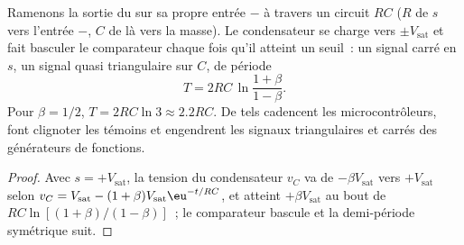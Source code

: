 \begin{proposition}\label{prop:b2:feedback-oscillators:astable}
Ramenons la sortie du  sur sa propre entrée $-$
à travers un circuit $RC$ ($R$ de $s$ vers l'entrée $-$, $C$ de là
vers la masse). Le condensateur se charge vers $\pm V_{\text{sat}}$ et fait basculer le
comparateur chaque fois qu'il atteint un seuil~: un signal carré en $s$, un
signal quasi triangulaire sur $C$, de période
\[
T = 2RC\,\ln\frac{1 + \beta}{1 - \beta} .
\]
Pour $\beta = 1/2$, $T = 2RC\ln3 \approx 2.2RC$. De tels \emph{} cadencent les microcontrôleurs, font clignoter les témoins et engendrent
les signaux triangulaires et carrés des générateurs de fonctions.
\end{proposition}

\begin{proof}
Avec $s = +V_{\text{sat}}$, la tension du condensateur $v_C$ va de
$-\beta V_{\text{sat}}$ vers $+V_{\text{sat}}$ selon $v_C = V_{\text{sat}} - (1 + \beta)
V_{\text{sat}}\eu^{-t/RC}$, et atteint $+\beta V_{\text{sat}}$ au bout de $RC\ln[(1 + \beta)
/(1 - \beta)]$~; le comparateur bascule et la demi-période symétrique suit.
\end{proof}

